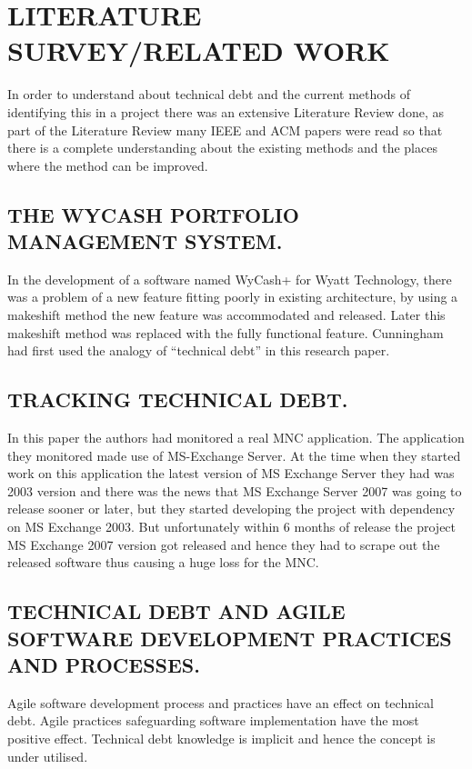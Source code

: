 
\chapter{\uppercase{Literature Survey/Related Work}} %
\label{ch:survey} %

In order to understand about technical debt and the current methods of identifying this in a project there was an extensive Literature Review done, as part of the Literature Review many IEEE and ACM papers were read so that there is a complete understanding about the existing methods and the places where the method can be improved.
\section{\uppercase{The WyCash portfolio management system.}}
In the development of a software named WyCash+ for Wyatt Technology, there was a problem of a new feature fitting poorly in existing architecture, by using a makeshift method the new feature was accommodated and released. Later this makeshift method was replaced with the fully functional feature. Cunningham had first used the analogy of “technical debt” in this research paper.
\section{\uppercase{Tracking Technical Debt.}}
In this paper the authors had monitored a real MNC application. The application they monitored made use of MS-Exchange Server. At the time when they started work on this application the latest version of MS Exchange Server they had was 2003 version and there was the news that MS Exchange Server 2007 was going to release sooner or later, but they started developing the project with dependency on MS Exchange 2003. But unfortunately within 6 months of release the project MS Exchange 2007 version got released and hence they had to scrape out the released software thus causing a huge loss for the MNC. 
\section{\uppercase{Technical debt and agile software development practices and processes.}}
Agile software development process and practices have an effect on technical debt. Agile practices safeguarding software implementation have the most positive effect. Technical debt knowledge is implicit and hence the concept is under utilised.
